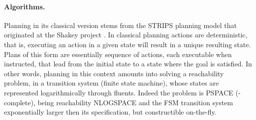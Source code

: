\paragraph{Algorithms.}

Planning in its classical version stems from the STRIPS planning model
\cite{FikesN71} that originated at the Shakey project
\cite{Nils-84,KuipersFHN17}.  In classical planning actions are deterministic, that is,
executing an action in a given state will result in a unique resulting
state. Plans of this form are essentially sequence of
actions, each executable when instructed, that lead from the initial
state to a state where the goal is satisfied. In other words, planning
in this context amounts into solving a reachability problem, in a
transition system (finite state machine), whose states are represented
logarithmically through fluents. Indeed the problem is PSPACE
(-complete), being reachability NLOGSPACE and the FSM transition
system exponentially larger then its specification, but constructible
on-the-fly.




